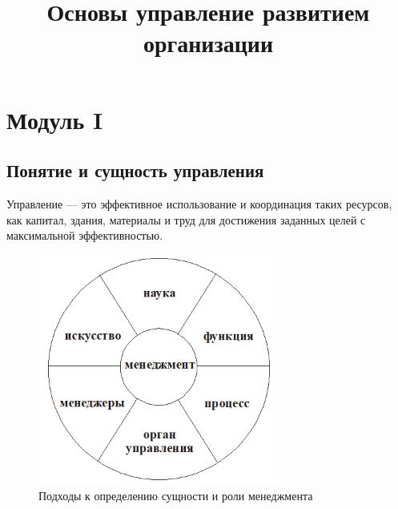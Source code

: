 \documentclass[a4paper,12pt,oneside,final]{extarticle}
\makeatletter
\numberwithin{equation}{section}
\def\maxwidth#1{\ifdim\Gin@nat@width>#1 #1\else\Gin@nat@width\fi}
\makeatother
\begin{document}
\title{Основы управление развитием организации}
\maketitle
\tableofcontents

%
%
\section{Модуль I}
\subsection{Понятие и сущность управления}
Управление --- это эффективное использование и координация таких ресурсов, как капитал, здания, материалы и труд для достижения заданных целей с максимальной эффективностью.

\begin{figure}[h]
	\centering
	\includegraphics[width=\maxwidth{\textwidth}]{management-figures/management}
	\caption{Подходы к определению сущности и роли менеджмента}
\end{figure}
\end{document}
